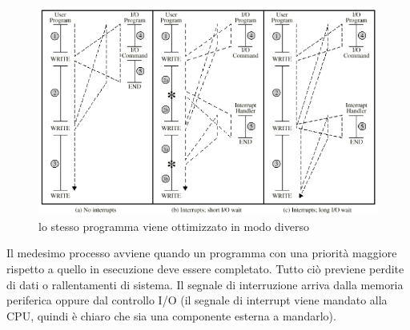 \documentclass{article}
\begin{document}
\begin{figure}[ht]
	\centering
	\includegraphics[scale=0.3]{immagini/ottimizzazione_cpu}
	\caption{lo stesso programma viene ottimizzato in modo diverso}
\end{figure}

Il medesimo processo avviene quando un programma con una priorità maggiore rispetto a quello in esecuzione deve essere completato. Tutto ciò previene perdite di dati o rallentamenti di sistema. Il segnale di interruzione arriva dalla memoria periferica oppure dal controllo I/O (il segnale di interrupt viene mandato alla CPU, quindi è chiaro che sia una componente esterna a mandarlo).
\end{document}
